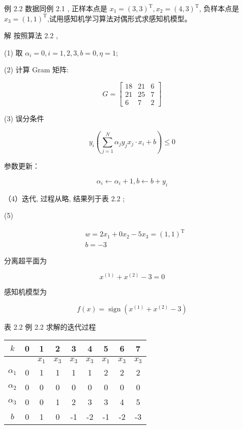 \documentclass[10pt]{article}
\begin{document}
例 2.2 数据同例 2.1 , 正样本点是 $x_{1}=(3,3)^{\mathrm{T}}, x_{2}=(4,3)^{\mathrm{T}}$, 负样本点是 $x_{3}=(1,1)^{\mathrm{T}}$,试用感知机学习算法对偶形式求感知机模型。

解 按照算法 2.2 ,

(1) 取 $\alpha_{i}=0, i=1,2,3, b=0, \eta=1$;

(2) 计算 Gram 矩阵:

$$
G=\left[\begin{array}{ccc}
18 & 21 & 6 \\
21 & 25 & 7 \\
6 & 7 & 2
\end{array}\right]
$$

(3) 误分条件

$$
y_{i}\left(\sum_{j=1}^{N} \alpha_{j} y_{j} x_{j} \cdot x_{i}+b\right) \leqslant 0
$$

参数更新：

$$
\alpha_{i} \leftarrow \alpha_{i}+1, b \leftarrow b+y_{i}
$$

（4）迭代, 过程从略, 结果列于表 2.2 ;

(5)

$$
\begin{aligned}
& w=2 x_{1}+0 x_{2}-5 x_{3}=(1,1)^{\mathrm{T}} \\
& b=-3
\end{aligned}
$$

分离超平面为

$$
x^{(1)}+x^{(2)}-3=0
$$

感知机模型为

$$
f(x)=\operatorname{sign}\left(x^{(1)}+x^{(2)}-3\right)
$$

表 2.2 例 2.2 求解的迭代过程

\begin{center}
\begin{tabular}{ccccccccc}
\hline
$k$ & 0 & 1 & 2 & 3 & 4 & 5 & 6 & 7 \\
\hline
 &  & $x_{1}$ & $x_{3}$ & $x_{3}$ & $x_{3}$ & $x_{1}$ & $x_{3}$ & $x_{3}$ \\
$\alpha_{1}$ & 0 & 1 & 1 & 1 & 1 & 2 & 2 & 2 \\
$\alpha_{2}$ & 0 & 0 & 0 & 0 & 0 & 0 & 0 & 0 \\
$\alpha_{3}$ & 0 & 0 & 1 & 2 & 3 & 3 & 4 & 5 \\
$b$ & 0 & 1 & 0 & -1 & -2 & -1 & -2 & -3 \\
\hline
\end{tabular}
\end{center}
\end{document}

